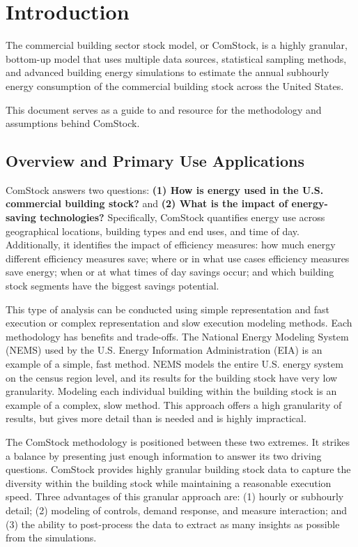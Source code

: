 \chapter{Introduction}
The commercial building sector stock model, or ComStock, is a highly granular, bottom-up model that uses multiple data sources, statistical sampling methods, and advanced building energy simulations to estimate the annual subhourly energy consumption of the commercial building stock across the United States.

This document serves as a guide to and resource for the methodology and assumptions behind ComStock.

\section{Overview and Primary Use Applications}
ComStock answers two questions: \textbf{(1) How is energy used in the U.S. commercial building stock?} and \textbf{(2) What is the impact of energy-saving technologies?} Specifically, ComStock quantifies energy use across geographical locations, building types and end uses, and time of day. Additionally, it identifies the impact of efficiency measures: how much energy different efficiency measures save; where or in what use cases efficiency measures save energy; when or at what times of day savings occur; and which building stock segments have the biggest savings potential.

This type of analysis can be conducted using simple representation and fast execution or complex representation and slow execution modeling methods. Each methodology has benefits and trade-offs. The National Energy Modeling System (NEMS) used by the U.S. Energy Information Administration (EIA) is an example of a simple, fast method. NEMS models the entire U.S. energy system on the census region level, and its results for the building stock have very low granularity. Modeling each individual building within the building stock is an example of a complex, slow method. This approach offers a high granularity of results, but gives more detail than is needed and is highly impractical.

The ComStock methodology is positioned between these two extremes. It strikes a balance by presenting just enough information to answer its two driving questions. ComStock provides highly granular building stock data to capture the diversity within the building stock while maintaining a reasonable execution speed. Three advantages of this granular approach are: (1) hourly or subhourly detail; (2) modeling of controls, demand response, and measure interaction; and (3) the ability to post-process the data to extract as many insights as possible from the simulations.

